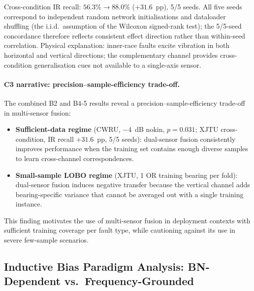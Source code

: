 \begin{table}[htbp]
\begin{tablenotes}
\item Cross-condition IR recall: $56.3\% \to 88.0\%$ ($+31.6$~pp), 5/5 seeds.
      All five seeds correspond to independent random network initialisations
      and dataloader shuffling (the i.i.d.\ assumption of the Wilcoxon
      signed-rank test); the 5/5-seed concordance therefore reflects
      consistent effect direction rather than within-seed correlation.
      Physical explanation: inner-race faults excite vibration in both
      horizontal and vertical directions; the complementary channel provides
      cross-condition generalisation cues not available to a single-axis sensor.
\end{tablenotes}
\end{table}

\paragraph{C3 narrative: precision--sample-efficiency trade-off.}
The combined B2 and B4-5 results reveal a precision--sample-efficiency
trade-off in multi-sensor fusion:
\begin{itemize}
\item \textbf{Sufficient-data regime} (CWRU, $-4$~dB nokin, $p=0.031$;
  XJTU cross-condition, IR recall $+31.6$~pp, 5/5 seeds):
  dual-sensor fusion consistently improves performance when the training set
  contains enough diverse samples to learn cross-channel correspondences.
\item \textbf{Small-sample LOBO regime} (XJTU, 1 OR training bearing per fold):
  dual-sensor fusion induces negative transfer because the vertical channel
  adds bearing-specific variance that cannot be averaged out with a
  single training instance.
\end{itemize}
This finding motivates the use of multi-sensor fusion in deployment contexts
with sufficient training coverage per fault type, while cautioning against
its use in severe few-sample scenarios.


\subsection{Inductive Bias Paradigm Analysis: BN-Dependent vs.\ Frequency-Grounded}
\label{subsec:paradigm}


